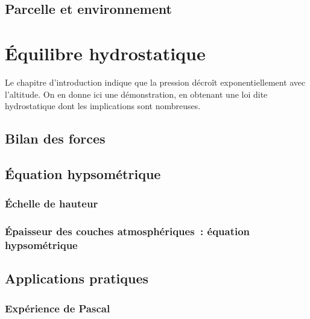 \sk
\subsection{Parcelle et environnement} \label{parcenv}

	

\mk
\section{Équilibre hydrostatique}

\sk
Le chapitre d'introduction indique que la pression décroît exponentiellement avec l'altitude. On en donne ici une démonstration, en obtenant une loi dite hydrostatique dont les implications sont nombreuses. 

\sk
\subsection{Bilan des forces}

	

\sk
\subsection{\'Equation hypsométrique}

\sk
\subsubsection{\'Echelle de hauteur}

	

\sk
\subsubsection{\'Epaisseur des couches atmosphériques~: équation hypsométrique}

	

\sk
\subsection{Applications pratiques}

\sk
\subsubsection{Expérience de Pascal}

